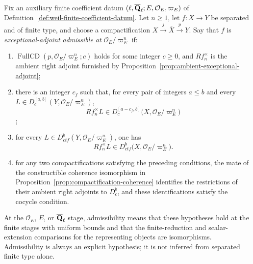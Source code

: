 \begin{definition}
\label{def:exceptional-adjoint-admissible}


Fix an auxiliary finite coefficient datum
\((\ell,\overline{\mathbf Q}_\ell;E,\mathcal O_E,\varpi_E)\) of
Definition~\ref{def:weil-finite-coefficient-datum}.  Let \(n\geq1\), let
\(f:X\to Y\) be separated and of finite type, and
choose a compactification
\(X\xrightarrow{j}\overline X\xrightarrow{p}Y\).  Say that \(f\) is
\emph{exceptional-adjoint admissible at
\(\mathcal O_E/\varpi_E^n\)} if:
\begin{enumerate}[label=\textup{(\alph*)}]
\item \(\operatorname{FullCD}(p,\mathcal O_E/\varpi_E^n;c)\) holds for some
integer \(c\geq0\), and
\(Rf_n^{\times}\) is the ambient right adjoint furnished by
Proposition~\ref{prop:ambient-exceptional-adjoint};
\item there is an integer \(c_f\) such that, for every pair of integers
\(a\leq b\) and
every \(L\in D_c^{[a,b]}(Y,\mathcal O_E/\varpi_E^n)\),
\[
 Rf_n^{\times}L\in
 D_c^{[a-c_f,b]}\bigl(X,\mathcal O_E/\varpi_E^n\bigr)
\]
;
\item for every
\(L\in D^b_{ctf}(Y,\mathcal O_E/\varpi_E^n)\), one has
\[
 Rf_n^{\times}L\in
 D^b_{ctf}\bigl(X,\mathcal O_E/\varpi_E^n\bigr).
\]
\item for any two compactifications satisfying the preceding conditions,
the mate of the constructible coherence isomorphism in
Proposition~\ref{prop:compactification-coherence} identifies the restrictions
of their ambient right adjoints to \(D^b_c\), and these identifications
satisfy the cocycle condition.
\end{enumerate}
At the \(\mathcal O_E\), \(E\), or \(\overline{\mathbf Q}_\ell\) stage, admissibility means that
these hypotheses hold at the finite stages with uniform bounds and that the
finite-reduction and scalar-extension comparisons for the representing
objects are isomorphisms.  Admissibility is always an explicit hypothesis;
it is not inferred from separated finite type alone.
\end{definition}


